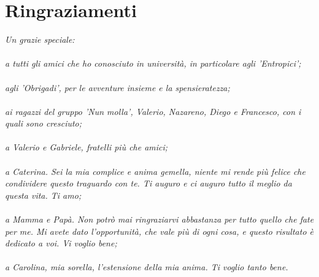 \documentclass[twoside, 11pt]{amsbook}
\newcommand{\co}[1]{\textit{#1}}%
\newcommand{\0}{{(0)}}
\newcommand{\3}{{(3)}}
\theoremstyle{colonplain}
\theoremstyle{colondefinition}
\theoremstyle{colonremark}
\numberwithin{equation}{chapter}
\begin{document}
\chapter*{Ringraziamenti}
\co{Un grazie speciale: \\ \\
a tutti gli amici che ho conosciuto in università, in particolare agli 'Entropici'; \\ \\
agli 'Obrigadi', per le avventure insieme e la spensieratezza; \\ \\
ai ragazzi del gruppo 'Nun molla', Valerio, Nazareno, Diego e Francesco, con i quali sono cresciuto; \\ \\
a Valerio e Gabriele, fratelli più che amici; \\ \\
a Caterina. Sei la mia complice e anima gemella, niente mi rende più felice che condividere questo traguardo con te. Ti auguro e ci auguro tutto il meglio da questa vita. Ti amo; \\ \\
a Mamma e Papà. Non potrò mai ringraziarvi abbastanza per tutto quello che fate per me. Mi avete dato l'opportunità, che vale più di ogni cosa, e questo risultato è dedicato a voi. Vi voglio bene; \\ \\
a Carolina, mia sorella, l'estensione della mia anima. Ti voglio tanto bene.}
\end{document}

